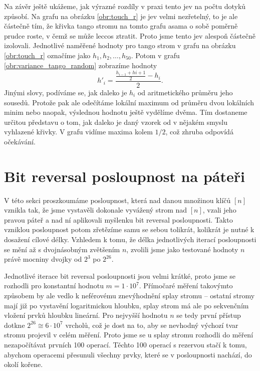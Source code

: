 
Na závěr ještě ukážeme, jak výrazné rozdíly v praxi tento jev na počtu dotyků
způsobí. Na grafu na obrázku \ref{obr:touch_r} je jev velmi nezřetelný, to je ale
částečně tím, že křivka tango stromu na tomto grafu asama o sobě poměrně prudce
roste, v čemž se může leccos ztratit. Proto jsme tento jev alespoň částečně
izolovali. Jednotlivé naměřené hodnoty pro tango strom v grafu na obrázku
\ref{obr:touch_r} označíme jako $h_1, h_2, \dots, h_{50}$. Potom v grafu
\ref{obr:variance_tango_random} zobrazíme hodnoty $$h'_i =
\frac{\frac{h_{i-1}+h{i+1}}2-h_i}2.$$ Jinými slovy, podíváme se, jak daleko je
$h_i$ od aritmetického průměru jeho sousedů. Protože pak ale odečítáme lokální
maximum od průměru dvou lokálních minim nebo naopak, výslednou hodnotu ještě
vydělíme dvěma. Tím dostaneme určitou představu o tom, jak daleko je daný
vzorek od v nějakém smyslu vyhlazené křivky. V grafu vidíme maxima kolem $1/2$,
což zhruba odpovídá očekávání. 

\section{Bit reversal posloupnost na páteři}

V této sekci proszkoumáme posloupnost, která nad danou množinou klíčů $[n]$
vznikla tak, že jsme vystavěli dokonale vyvážený strom nad $[n]$, vzali jeho
pravou páteř a nad ní aplikovali myšlenku bit reversal posloupnosti. Takto
vzniklou posloupnost potom zřetězíme samu se sebou tolikrát, kolikrát je nutné
k dosažení cílové délky. Vzhledem k tomu, že délka jednotlivých iterací
posloupnosti se mění až s dvojnásobným zvětšením $n$, zvolili jsme jako
testované hodnoty $n$ právě mocniny dvojky od $2^3$ po $2^{26}$.

Jednotlivé iterace bit reversal posloupnosti jsou velmi krátké, proto jsme se
rozhodli pro konstantní hodnotu $m=1\cdot10^7$. Přímočaré měření takovýmto
způsobem by ale vedlo k neférovému znevýhodnění splay stromu -- ostatní stromy
mají již po vystavění logaritmickou hloubku, splay strom má ale po sekvenčním
vložení prvků hloubku lineární. Pro nejvyšší hodnotu $n$ se tedy první přístup
dotkne $2^{26} \cong 6\cdot10^7$ vrcholů, což je dost na to, aby se nevhodný
výchozí tvar stromu projevil v celém měření. Proto jsme se u splay stromu
rozhodli do měření nezapočítávat prvních 100 operací. Těchto 100 operací s
rezervou stačí k tomu, abychom operacemi  přesunuli všechny prvky,
které se v posloupnosti nachází, do okolí kořene.

